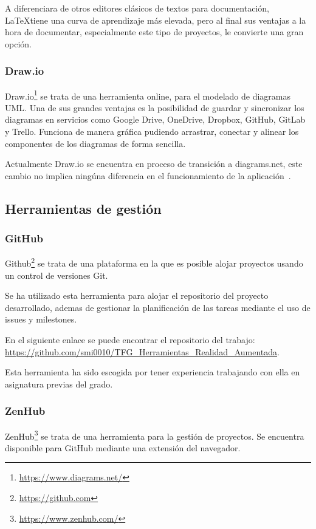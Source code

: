 A diferenciara de otros editores clásicos de textos para documentación, \LaTeX tiene una curva de aprendizaje más elevada, pero al final sus ventajas a la hora de documentar, especialmente este tipo de proyectos, le convierte una gran opción.


\subsubsection{Draw.io}
Draw.io\footnote{\url{https://www.diagrams.net/}} se trata de una herramienta online, para el modelado de diagramas UML. Una de sus grandes ventajas es la posibilidad de guardar y sincronizar los diagramas en servicios como Google Drive, OneDrive, Dropbox, GitHub, GitLab y Trello. Funciona de manera gráfica pudiendo arrastrar, conectar y alinear los componentes de los diagramas de forma sencilla.

Actualmente Draw.io se encuentra en proceso de transición a diagrams.net, este cambio no implica ningúna diferencia en el funcionamiento de la aplicación~\cite{diagramsNet}.



\subsection{Herramientas de gestión}

\subsubsection{GitHub}\label{github}
Github\footnote{\url{https://github.com}} se trata de una plataforma en la que es posible alojar proyectos usando un control de versiones Git.

Se ha utilizado esta herramienta para alojar el repositorio del proyecto desarrollado, ademas de gestionar la planificación de las tareas mediante el uso de issues y milestones.

En el siguiente enlace se puede encontrar el repositorio del trabajo: \url{https://github.com/smi0010/TFG_Herramientas_Realidad_Aumentada}.

Esta herramienta ha sido escogida por tener experiencia trabajando con ella en asignatura previas del grado.

\subsubsection{ZenHub}\label{ZenHub}
ZenHub\footnote{\url{https://www.zenhub.com/}} se trata de una herramienta para la gestión de proyectos. Se encuentra disponible para GitHub mediante una extensión del navegador.

